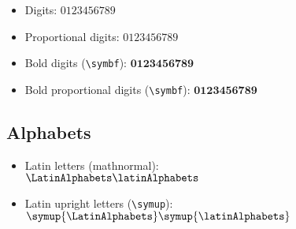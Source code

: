 \documentclass[english,log-declarations=false]{article}
\begin{document}
\begin{itemize}
  \item Digits: \hfill $ 0123456789 $
  \item Proportional digits: \hfill\begingroup{} $ 0123456789 $ \endgroup
  \item Bold digits (\verb|\symbf|): \hfill $ \symbf{0123456789} $
  \item Bold proportional digits (\verb|\symbf|): \hfill \begingroup{}$\symbf{0123456789}$\endgroup
\end{itemize}

\subsection{Alphabets}

\begin{itemize}
  \item Latin letters (mathnormal):\\
        $ \LatinAlphabets \latinAlphabets $

  \item Latin upright letters (\verb|\symup|):\\
        $ \symup{\LatinAlphabets} \symup{\latinAlphabets}$


\end{itemize}
\end{document}
